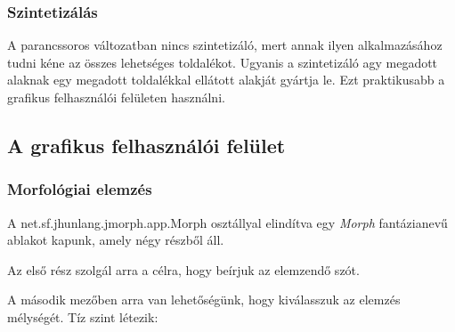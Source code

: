 \documentclass{article}
\begin{document}
\subsubsection{Szintetiz\'al\'as}

A parancssoros v\'altozatban nincs szintetiz\'al\'o, mert annak ilyen alkalmaz\'as\'ahoz tudni k\'ene az \"osszes lehets\'eges toldal\'ekot. Ugyanis a szintetiz\'al\'o agy megadott alaknak egy megadott toldal\'ekkal ell\'atott alakj\'at gy\'artja le. Ezt praktikusabb a grafikus felhaszn\'al\'oi fel\"uleten haszn\'alni. \par

\subsection{A grafikus felhaszn\'al\'oi fel\"ulet}

\subsubsection{Morfol\'ogiai elemz\'es}

A net.sf.jhunlang.jmorph.app.Morph oszt\'allyal elind\'{i}tva egy \emph{Morph} fant\'azianev\H{u} ablakot kapunk, amely n\'egy r\'eszb\H{o}l \'all. \par
Az els\H{o} r\'esz szolg\'al arra a c\'elra, hogy be\'{i}rjuk az elemzend\H{o} sz\'ot. \par
A m\'asodik mez\H{o}ben arra van lehet\H{o}s\'eg\"unk, hogy kiv\'alasszuk az elemz\'es m\'elys\'eg\'et. T\'{i}z szint l\'etezik:
\end{document}
